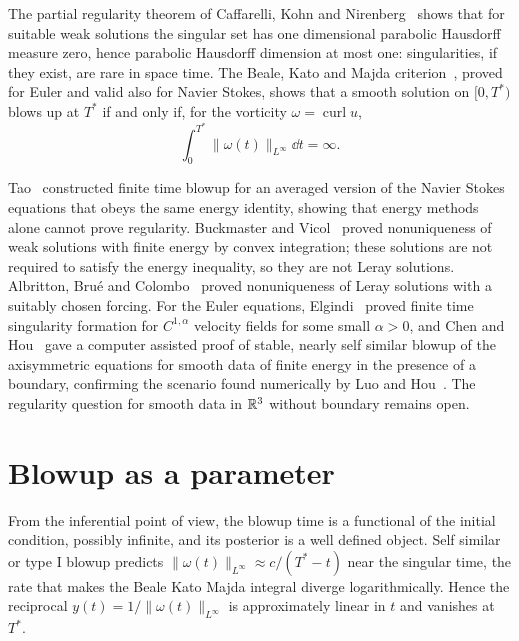 The partial regularity theorem of Caffarelli, Kohn and Nirenberg~\cite{ckn1982} shows that for suitable weak solutions the singular set has one dimensional parabolic Hausdorff measure zero, hence parabolic Hausdorff dimension at most one: singularities, if they exist, are rare in space time. The Beale, Kato and Majda criterion~\cite{bkm1984}, proved for Euler and valid also for Navier Stokes, shows that a smooth solution on $[0,T^*)$ blows up at $T^*$ if and only if, for the vorticity $\omega=\operatorname{curl}u$,
\[
\int_0^{T^*}\|\omega(t)\|_{L^\infty}\dd t = \infty.
\]

Tao~\cite{tao2016} constructed finite time blowup for an averaged version of the Navier Stokes equations that obeys the same energy identity, showing that energy methods alone cannot prove regularity. Buckmaster and Vicol~\cite{buckmastervicol2019} proved nonuniqueness of weak solutions with finite energy by convex integration; these solutions are not required to satisfy the energy inequality, so they are not Leray solutions. Albritton, Bru\'e and Colombo~\cite{abc2022} proved nonuniqueness of Leray solutions with a suitably chosen forcing. For the Euler equations, Elgindi~\cite{elgindi2021} proved finite time singularity formation for $C^{1,\alpha}$ velocity fields for some small $\alpha>0$, and Chen and Hou~\cite{chenhou2022,chenhou2025} gave a computer assisted proof of stable, nearly self similar blowup of the axisymmetric equations for smooth data of finite energy in the presence of a boundary, confirming the scenario found numerically by Luo and Hou~\cite{luohou2014}. The regularity question for smooth data in $\mathbb{R}^3$ without boundary remains open.

\section{Blowup as a parameter}\label{sec:blowup_param}

From the inferential point of view, the blowup time is a functional of the initial condition, possibly infinite, and its posterior is a well defined object. Self similar or type I blowup predicts $\|\omega(t)\|_{L^\infty}\approx c/(T^*-t)$ near the singular time, the rate that makes the Beale Kato Majda integral diverge logarithmically. Hence the reciprocal $y(t) = 1/\|\omega(t)\|_{L^\infty}$ is approximately linear in $t$ and vanishes at $T^*$.

